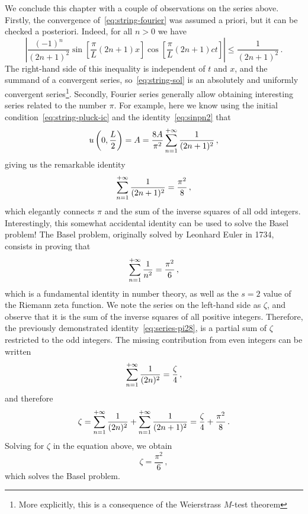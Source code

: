 We conclude this chapter with a couple of observations on the series above. Firstly, the convergence of~\cref{eq:string-fourier} was assumed a priori, but it can be checked a posteriori. Indeed, for all $n>0$ we have
\begin{equation}
  \left|\frac{(-1)^n}{(2n+1)^2}\sin\left[\frac{\pi}{L}(2n+1)x\right]\cos\left[\frac{\pi}{L}(2n+1)ct\right]\right|
  \leq\frac{1}{(2n+1)^2}\,.
\end{equation}
The right-hand side of this inequality is independent of $t$ and $x$, and the summand of a convergent series, so~\cref{eq:string-sol} is an absolutely and uniformly convergent series\footnote{More explicitly, this is a consequence of the Weierstrass $M$-test theorem}. Secondly, Fourier series generally allow obtaining interesting series related to the number $\pi$. For example, here we know using the initial condition~\cref{eq:string-pluck-ic} and the identity~\cref{eq:sinpn2} that
\begin{equation}
  u\left(0,\frac{L}{2}\right)=A=\frac{8A}{\pi^2}\sum_{n=1}^{+\infty}\frac{1}{(2n+1)^2}\,,
\end{equation}
giving us the remarkable identity
\begin{equation}
  \sum_{n=1}^{+\infty}\frac{1}{(2n+1)^2}=\frac{\pi^2}{8}\,,
  \label{eq:series-pi28}
\end{equation}
which elegantly connects $\pi$ and the sum of the inverse squares of all odd integers.
Interestingly, this somewhat accidental identity can be used to solve the Basel problem! The Basel
problem, originally solved by Leonhard Euler in 1734, consists in proving that
\begin{equation}
  \sum_{n=1}^{+\infty}\frac{1}{n^2}=\frac{\pi^2}{6}\,,
\end{equation}
which is a fundamental identity in number theory, as well as the $s=2$ value of the Riemann zeta function.
We note the series on the left-hand side as $\zeta$, and observe that it is the sum of the inverse squares of all positive integers. Therefore, the previously demonstrated identity~\cref{eq:series-pi28}, is a partial sum of $\zeta$ restricted to the odd integers. The missing contribution from even integers can be written
\begin{equation}
  \sum_{n=1}^{+\infty}\frac{1}{(2n)^2}=\frac{\zeta}{4}\,,
\end{equation}
and therefore
\begin{equation}
  \zeta=\sum_{n=1}^{+\infty}\frac{1}{(2n)^2}+\sum_{n=1}^{+\infty}\frac{1}{(2n+1)^2}=\frac{\zeta}{4}+\frac{\pi^2}{8}\,.
\end{equation}
Solving for $\zeta$ in the equation above, we obtain
\begin{equation}
  \zeta=\frac{\pi^2}{6}\,,
\end{equation}
which solves the Basel problem.

